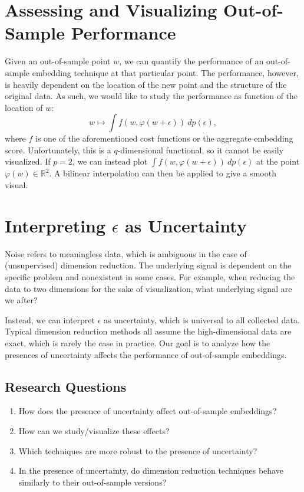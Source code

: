 \documentclass{article}
\begin{document}
\section{Assessing and Visualizing Out-of-Sample Performance}
Given an out-of-sample point $w$, we can quantify the performance of an out-of-sample embedding technique at that particular point. The performance, however, is heavily dependent on the location of the new point and the structure of the original data. As such, we would like to study the performance as function of the location of $w$: $$w \mapsto \int f(w, \varphi(w + \epsilon)) \:dp(\epsilon),$$ where $f$ is one of the aforementioned cost functions or the aggregate embedding score. Unfortunately, this is a $q$-dimensional functional, so it cannot be easily visualized. If $p = 2$, we can instead plot $\int f(w, \varphi(w + \epsilon)) \:dp(\epsilon)$ at the point $\varphi(w) \in \mathbb{R}^2$. A bilinear interpolation can then be applied to give a smooth visual.

\section{Interpreting $\epsilon$ as Uncertainty}
Noise refers to meaningless data, which is ambiguous in the case of (unsupervised) dimension reduction. The underlying signal is dependent on the specific problem and nonexistent in some cases. For example, when reducing the data to two dimensions for the sake of visualization, what underlying signal are we after?

\bigbreak Instead, we can interpret $\epsilon$ as uncertainty, which is universal to all collected data. Typical dimension reduction methods all assume the high-dimensional data are exact, which is rarely the case in practice. Our goal is to analyze how the presences of uncertainty affects the performance of out-of-sample embeddings.

\subsection{Research Questions}
\begin{enumerate}
	\item How does the presence of uncertainty affect out-of-sample embeddings?
	\item How can we study/visualize these effects?
	\item Which techniques are more robust to the presence of uncertainty?
	\item In the presence of uncertainty, do dimension reduction techniques behave similarly to their out-of-sample versions?
\end{enumerate}
\end{document}
